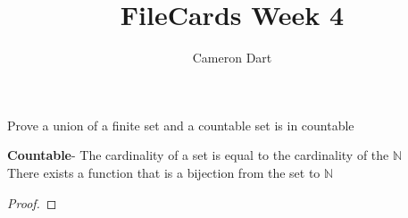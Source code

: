 \documentclass[12pt]{article}
\newcommand{\N}{\mathbb{N}}
\newenvironment{question}[2][Question]{\begin{trivlist}
\item[\hskip \labelsep {\bfseries #1}\hskip \labelsep {\bfseries #2.}]}{\end{trivlist}}
\begin{document}
 
 
\title{FileCards Week 4}
\author{Cameron Dart}
\maketitle
 
\begin{question}{1}
Prove a union of a finite set and a countable set is in countable
\end{question}
\textbf{Countable}- The cardinality of a set is equal to the cardinality of the $\N$\\
There exists a function that is a bijection from the set to $\N$\\
\begin{proof}

\end{proof}
\end{document}
